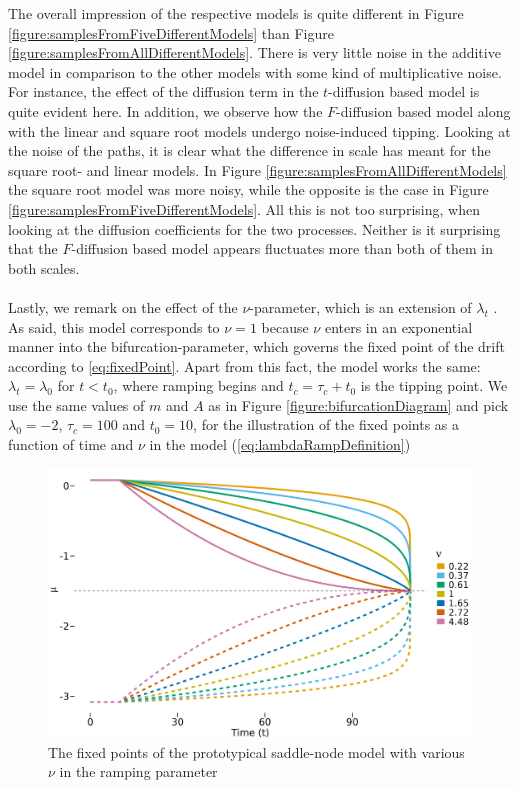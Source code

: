 The overall impression of the respective models is quite different in Figure \ref{figure:samplesFromFiveDifferentModels} than Figure \ref{figure:samplesFromAllDifferentModels}. There is very little noise in the additive model in comparison to the other models with some kind of multiplicative noise. For instance, the effect of the diffusion term in the $t$-diffusion based model is quite evident here. In addition, we observe how the $F$-diffusion based model along with the linear and square root models undergo noise-induced tipping. Looking at the noise of the paths, it is clear what the difference in scale has meant for the square root- and linear models. In Figure \ref{figure:samplesFromAllDifferentModels} the square root model was more noisy, while the opposite is the case in Figure \ref{figure:samplesFromFiveDifferentModels}. All this is not too surprising, when looking at the diffusion coefficients for the two processes. Neither is it surprising that the $F$-diffusion based model appears fluctuates more than both of them in both scales.\\\\
Lastly, we remark on the effect of the $\nu$-parameter, which is an extension of $\lambda_t$ \cite[equation (2)]{Ditlevsen2023}. As said, this model corresponds to $\nu = 1$ because $\nu$ enters in an exponential manner into the bifurcation-parameter, which governs the fixed point of the drift according to \ref{eq:fixedPoint}. Apart from this fact, the model works the same: $\lambda_t = \lambda_0$ for $t<t_0$, where ramping begins and $t_c = \tau_c + t_0$ is the tipping point. We use the same values of $m$ and $A$ as in Figure \ref{figure:bifurcationDiagram} and pick $\lambda_0 = -2$, $\tau_c = 100$ and $t_0 = 10$, for the illustration of the fixed points as a function of time and $\nu$ in the model (\ref{eq:lambdaRampDefinition})
\begin{figure}[h!]
    \begin{center}
        \includegraphics[scale = .1]{figures/nu_plot.jpeg}
        \caption{The fixed points of the prototypical saddle-node model with various $\nu$ in the ramping parameter}
        \label{figure:nu_plot}    
    \end{center}
\end{figure}\\
